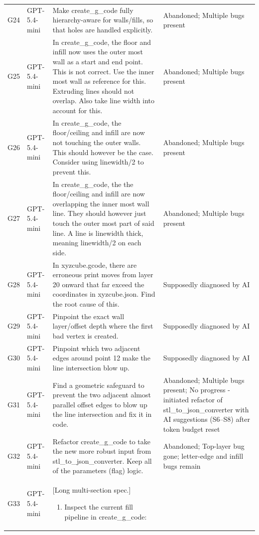 \documentclass[10pt,twocolumn,a4paper]{article}
\begin{document}
\begin{longtable}{@{}p{0.6cm}p{1.5cm}p{11.0cm}p{2.7cm}@{}}
\addlinespace
G24 & GPT-5.4-mini & Make create\_g\_code fully hierarchy-aware for walls/fills, so that holes are handled explicitly. & Abandoned; Multiple bugs present \\
\addlinespace
G25 & GPT-5.4-mini & In create\_g\_code, the floor and infill now uses the outer most wall as a start and end point. This is not correct. Use the inner most wall as reference for this. Extruding lines should not overlap. Also take line width into account for this. & Abandoned; Multiple bugs present \\
\addlinespace
G26 & GPT-5.4-mini & In create\_g\_code, the floor/ceiling and infill are now not touching the outer walls. This should however be the case. Consider using linewidth/2 to prevent this. & Abandoned; Multiple bugs present \\
\addlinespace
G27 & GPT-5.4-mini & In create\_g\_code, the the floor/ceiling and infill are now overlapping the inner most wall line. They should however just touch the outer most part of said line. A line is linewidth thick, meaning linewidth/2 on each side. & Abandoned; Multiple bugs present \\
\addlinespace
G28 & GPT-5.4-mini & In xyzcube.gcode, there are erroneous print moves from layer 20 onward that far exceed the coordinates in xyzcube.json. Find the root cause of this. & Supposedly diagnosed by AI \\
\addlinespace
G29 & GPT-5.4-mini & Pinpoint the exact wall layer/offset depth where the first bad vertex is created. & Supposedly diagnosed by AI \\
\addlinespace
G30 & GPT-5.4-mini & Pinpoint which two adjacent edges around point 12 make the line intersection blow up. & Supposedly diagnosed by AI\\
\addlinespace
G31 & GPT-5.4-mini & Find a geometric safeguard to prevent the two adjacent almost parallel offset edges to blow up the line intersection and fix it in code. & Abandoned; Multiple bugs present; No progress - initiated refactor of stl\_to\_json\_converter with AI suggestions (S6--S8) after token budget reset \\
\addlinespace
G32 & GPT-5.4-mini & Refactor create\_g\_code to take the new more robust input from stl\_to\_json\_converter. Keep all of the parameters (flag) logic. & Abandoned; Top-layer bug gone; letter-edge and infill bugs remain \\
\addlinespace
G33 & GPT-5.4-mini & [Long multi-section spec.]
\begin{enumerate}
	\item {Inspect the current fill pipeline in create\_g\_code:} 

\end{enumerate}
\end{longtable}
\end{document}
